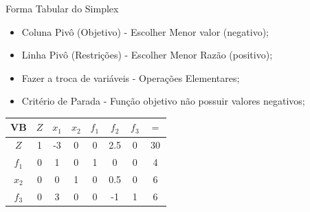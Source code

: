 \documentclass{if-beamer}
\begin{document}
\begin{frame}{Forma Tabular do Simplex}

\begin{itemize}
    \item {} Coluna Pivô (Objetivo) - Escolher Menor valor (negativo);
    \item {} Linha Pivô (Restrições) - Escolher Menor Razão (positivo);
    \item {} Fazer a troca de variáveis - Operações Elementares;
    \item {} Critério de Parada - Função objetivo não possuir valores negativos;
\end{itemize}

\begin{table}
    \centering
    \begin{tabular}{c|ccccccc}
    \hline
    VB    & $Z$ & $x_1$ & $x_2$ & $f_1$ & $f_2$ & $f_3$ & $=$  \\
    \hline
    $Z$   & 1   & -3    & 0     & 0     & 2.5   & 0     & 30   \\
    $f_1$ & 0   & 1     & 0     & 1     & 0     & 0     & 4    \\
    $x_2$ & 0   & 0     & 1     & 0     & 0.5   & 0     & 6    \\
    $f_3$ & 0   & 3     & 0     & 0     & -1    & 1     & 6    \\
    \hline
    \end{tabular}
\end{table}

\end{frame}

\end{document}
